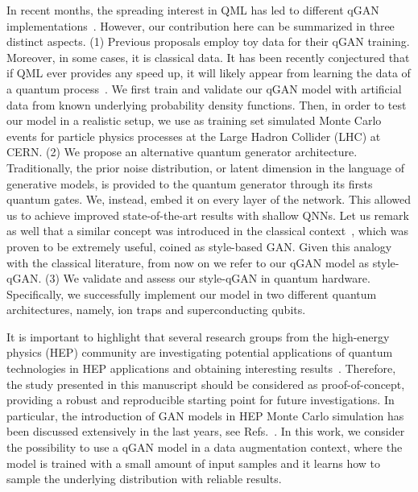 \documentclass[twocolumn,preprintnumbers,superscriptaddress]{revtex4-2}
\begin{document}
In recent months, the spreading interest in QML has led to different qGAN
implementations~\cite{zoufal2019quantum, zeng2019learning, situ2020quantum,
  hu2019quantum, benedetti2019adversarial, romero2021variational,
  niu2021entangling}. However, our contribution here can be summarized in three
distinct aspects. (1) Previous proposals employ toy data for their qGAN
training. Moreover, in some cases, it is classical data. It has been recently
conjectured that if QML ever provides any speed up, it will likely appear from
learning the data of a quantum process~\cite{huang2021information,
  kubler2021inductive}. We first train and validate our qGAN model with
artificial data from known underlying probability density functions. Then, in
order to test our model in a realistic setup, we use as training set simulated
Monte Carlo events for particle physics processes at the Large Hadron Collider
(LHC) at CERN. (2) We propose an alternative quantum generator architecture. Traditionally, the prior noise distribution, or latent dimension in the language of generative models, is provided to the quantum generator through its firsts quantum gates. We, instead, embed it on every layer
of the network. This
allowed us to achieve improved state-of-the-art results with shallow QNNs. Let us remark as well that a similar concept was introduced in the classical context~\cite{karras2019style}, which was proven to be extremely useful, coined as style-based GAN. Given this analogy with the classical literature, from now on we refer to our qGAN model as style-qGAN. (3) We validate and
assess our style-qGAN in quantum hardware. Specifically, we successfully implement our
model in two different quantum architectures, namely, ion traps and
superconducting qubits.

It is important to highlight that several research groups from the high-energy
physics (HEP) community are investigating potential applications of quantum
technologies in HEP applications and obtaining interesting
results~\cite{P_rez_Salinas_2021,Guan_2021,chang2021quantum,Chang_2021,Belis_2021,khattak2021fast}.
Therefore, the study presented in this manuscript should be considered as
proof-of-concept, providing a robust and reproducible starting point for future
investigations. In particular, the introduction of GAN models in HEP Monte Carlo
simulation has been discussed extensively in the last years, see
Refs.~\cite{baldi2021gan,Backes_2021,butter2020generative,Butter_2021,Butter_2020,Bellagente_2020,Butter_2019}.
In this work, we consider the possibility to use a qGAN model in a data
augmentation context, where the model is trained with a small amount of input
samples and it learns how to sample the underlying distribution with reliable
results.
\end{document}
